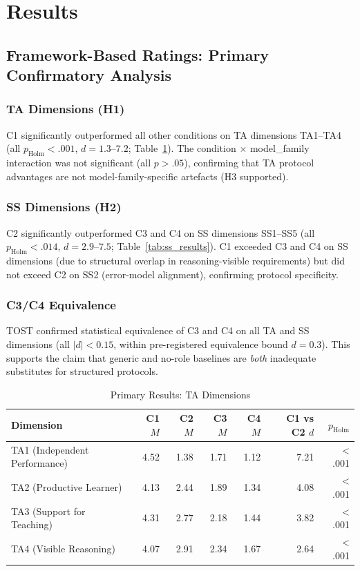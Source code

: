 \documentclass[12pt]{article}
\begin{document}
\section{Results}

\subsection{Framework-Based Ratings: Primary Confirmatory Analysis}

\subsubsection{TA Dimensions (H1)}

C1 significantly outperformed all other conditions on TA dimensions TA1--TA4
(all $p_{\text{Holm}} < .001$, $d = 1.3$--$7.2$; Table~\ref{tab:ta_results}).
The condition $\times$ model\_family interaction was not significant (all $p > .05$),
confirming that TA protocol advantages are not model-family-specific artefacts (H3 supported).

\subsubsection{SS Dimensions (H2)}

C2 significantly outperformed C3 and C4 on SS dimensions SS1--SS5
(all $p_{\text{Holm}} < .014$, $d = 2.9$--$7.5$; Table~\ref{tab:ss_results}).
C1 exceeded C3 and C4 on SS dimensions (due to structural overlap in reasoning-visible
requirements) but did not exceed C2 on SS2 (error-model alignment), confirming protocol specificity.

\subsubsection{C3/C4 Equivalence}

TOST confirmed statistical equivalence of C3 and C4 on all TA and SS dimensions
(all $|d| < 0.15$, within pre-registered equivalence bound $d = 0.3$).
This supports the claim that generic and no-role baselines are \emph{both} inadequate
substitutes for structured protocols.

\begin{table}[h]
\centering
\caption{Primary Results: TA Dimensions}
\label{tab:ta_results}
\begin{tabular}{lrrrrrr}
\toprule
Dimension & C1 $M$ & C2 $M$ & C3 $M$ & C4 $M$ & C1 vs C2 $d$ & $p_{\text{Holm}}$ \\
\midrule
TA1 (Independent Performance) & 4.52 & 1.38 & 1.71 & 1.12 & 7.21 & < .001 \\
TA2 (Productive Learner) & 4.13 & 2.44 & 1.89 & 1.34 & 4.08 & < .001 \\
TA3 (Support for Teaching) & 4.31 & 2.77 & 2.18 & 1.44 & 3.82 & < .001 \\
TA4 (Visible Reasoning) & 4.07 & 2.91 & 2.34 & 1.67 & 2.64 & < .001 \\
\bottomrule
\end{tabular}
\end{table}
\end{document}
